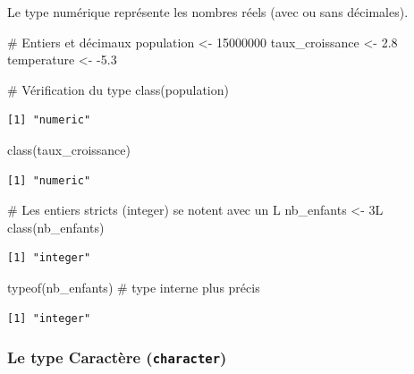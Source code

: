 \documentclass[
  french,
  11pt,
  a4paper,
]{article}
\newenvironment{Shaded}{}{}
\newcommand{\CommentTok}[1]{\textcolor[rgb]{0.42,0.45,0.49}{#1}}
\newcommand{\DecValTok}[1]{\textcolor[rgb]{0.00,0.36,0.77}{#1}}
\newcommand{\FloatTok}[1]{\textcolor[rgb]{0.00,0.36,0.77}{#1}}
\newcommand{\FunctionTok}[1]{\textcolor[rgb]{0.44,0.26,0.76}{#1}}
\newcommand{\NormalTok}[1]{\textcolor[rgb]{0.14,0.16,0.18}{#1}}
\newcommand{\OtherTok}[1]{\textcolor[rgb]{0.44,0.26,0.76}{#1}}
\newcommand{\SpecialCharTok}[1]{\textcolor[rgb]{0.00,0.36,0.77}{#1}}
\begin{document}
Le type numérique représente les nombres réels (avec ou sans décimales).

\begin{Shaded}
\begin{Highlighting}[]
\CommentTok{\# Entiers et décimaux}
\NormalTok{population }\OtherTok{\textless{}{-}} \DecValTok{15000000}
\NormalTok{taux\_croissance }\OtherTok{\textless{}{-}} \FloatTok{2.8}
\NormalTok{temperature }\OtherTok{\textless{}{-}} \SpecialCharTok{{-}}\FloatTok{5.3}

\CommentTok{\# Vérification du type}
\FunctionTok{class}\NormalTok{(population)}
\end{Highlighting}
\end{Shaded}

\begin{verbatim}
[1] "numeric"
\end{verbatim}

\begin{Shaded}
\begin{Highlighting}[]
\FunctionTok{class}\NormalTok{(taux\_croissance)}
\end{Highlighting}
\end{Shaded}

\begin{verbatim}
[1] "numeric"
\end{verbatim}

\begin{Shaded}
\begin{Highlighting}[]
\CommentTok{\# Les entiers stricts (integer) se notent avec un L}
\NormalTok{nb\_enfants }\OtherTok{\textless{}{-}} \DecValTok{3}\NormalTok{L}
\FunctionTok{class}\NormalTok{(nb\_enfants)}
\end{Highlighting}
\end{Shaded}

\begin{verbatim}
[1] "integer"
\end{verbatim}

\begin{Shaded}
\begin{Highlighting}[]
\FunctionTok{typeof}\NormalTok{(nb\_enfants)  }\CommentTok{\# type interne plus précis}
\end{Highlighting}
\end{Shaded}

\begin{verbatim}
[1] "integer"
\end{verbatim}

\subsubsection{\texorpdfstring{Le type Caractère
(\texttt{character})}{Le type Caractère (character)}}\label{le-type-caractuxe8re-character}
\end{document}

